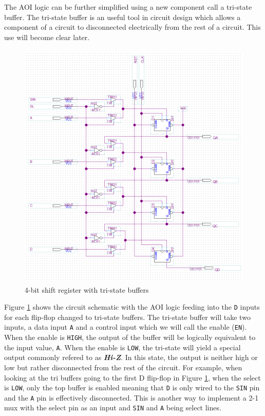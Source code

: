 \documentclass[CMPE]{KGCOEReport}
\begin{document}
\pagebreak

The AOI logic can be further simplified using a new component call a tri-state buffer. The tri-state buffer is an useful tool in circuit design which allows a component of a circuit to disconnected electrically from the rest of a circuit. This use will become clear later.


\begin{figure}[h!]
	\centering
	\includegraphics[height=12cm]{schematic2}
	\caption{4-bit shift register with tri-state buffers}
	\label{fig:shift-schem-tri}
\end{figure}

Figure \ref{fig:shift-schem-tri} shows the circuit schematic with the AOI logic feeding into the \texttt{D} inputs for each flip-flop changed to tri-state buffers. The tri-state buffer will take two inputs, a data input \texttt{A} and a control input which we will call the enable (\texttt{EN}). When the enable is \texttt{HIGH}, the output of the buffer will be logically equivalent to the input value, \texttt{A}. When the enable is \texttt{LOW}, the tri-state will yield a special output commonly refered to as \textbf{\emph{Hi-Z}}. In this state, the output is neither high or low but rather disconnected from the rest of the circuit. For example, when looking at the tri buffers going to the first D flip-flop in Figure \ref{fig:shift-schem-tri}, when the select is \texttt{LOW}, only the top buffer is enabled meaning that \texttt{D} is only wired to the \texttt{SIN} pin and the \texttt{A} pin is effectively disconnected. This is another way to implement a 2-1 mux with the select pin as an input and \texttt{SIN} and \texttt{A} being select lines.
\end{document}
